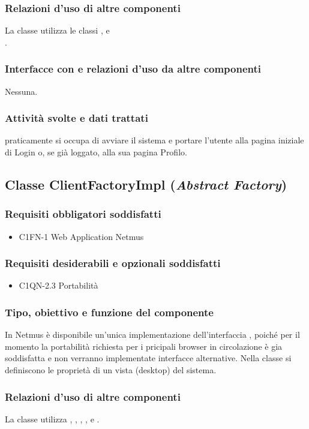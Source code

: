 \subsubsection*{Relazioni d'uso di altre componenti}
La classe  utilizza le classi ,
 e \\.
\subsubsection*{Interfacce con e relazioni d'uso da altre componenti}
Nessuna.
\subsubsection*{Attivit\`a svolte e dati trattati}
 praticamente si occupa di avviare il sistema e portare l'utente alla
pagina iniziale di Login o, se gi\`a loggato, alla sua pagina Profilo.

\subsection{Classe ClientFactoryImpl (\emph{Abstract Factory})}
\subsubsection*{Requisiti obbligatori soddisfatti}
\begin{itemize}
    \item C1FN-1 Web Application Netmus
\end{itemize}
\subsubsection*{Requisiti desiderabili e opzionali soddisfatti}
\begin{itemize}
	\item C1QN-2.3 Portabilit\`a
\end{itemize}
\subsubsection*{Tipo, obiettivo e funzione del componente}
In Netmus \`e disponibile un'unica implementazione dell'interfaccia
, poich\'e per il momento la portabilit\`a richiesta per i
pricipali browser in circolazione \`e gia soddisfatta e non verranno
implementate interfacce alternative. Nella classe si definiscono
le propriet\`a di un vista (desktop) del sistema.
\subsubsection*{Relazioni d'uso di altre componenti}
La classe utilizza , , ,
,  e
.
